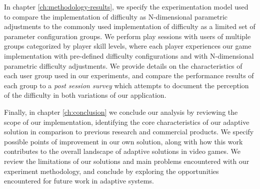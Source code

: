 In chapter \ref{ch:methodology-results}, we specify the experimentation model used to compare the implementation of difficulty as N-dimensional parametric adjustments to the commonly used implementation of difficulty as a limited set of parameter configuration groups. We perform play sessions with users of multiple groups categorized by player skill levels, where each player experiences our game implementation with pre-defined difficulty configurations and with N-dimensional parametric difficulty adjustments. We provide details on the characteristics of each user group used in our experiments, and compare the performance results of each group to a \emph{post session survey} which attempts to document the perception of the difficulty in both variations of our application.


Finally, in chapter \ref{ch:conclusion} we conclude our analysis by reviewing the scope of our implementation, identifying the core characteristics of our adaptive solution in comparison to previous research and commercial products. We specify possible points of improvement in our own solution, along with how this work contributes to the overall landscape of adaptive solutions in video games. We review the limitations of our solutions and main problems encountered with our experiment methodology, and conclude by exploring the opportunities encountered for future work in adaptive systems.
